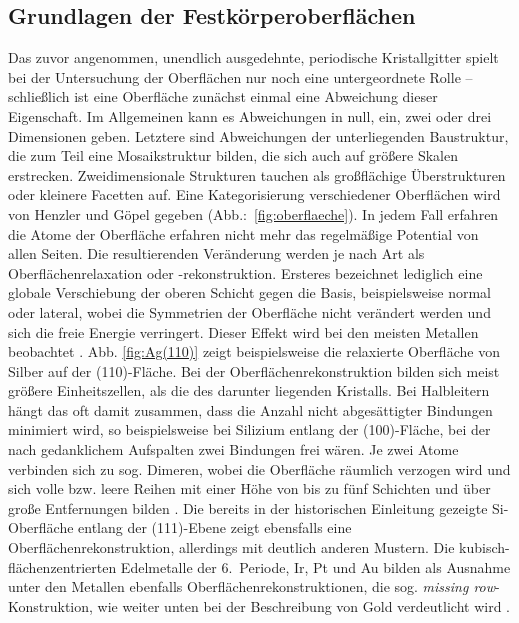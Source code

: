 \subsection{Grundlagen der Festkörperoberflächen}
Das zuvor angenommen, unendlich ausgedehnte, periodische Kristallgitter spielt 
bei der Untersuchung der Oberflächen nur noch eine untergeordnete Rolle – 
schließlich ist eine Oberfläche zunächst einmal eine Abweichung dieser 
Eigenschaft. Im Allgemeinen kann es Abweichungen in null, ein, zwei oder drei 
Dimensionen geben. Letztere sind Abweichungen der unterliegenden Baustruktur, 
die zum Teil eine Mosaikstruktur bilden, die sich auch auf größere Skalen 
erstrecken. Zweidimensionale Strukturen tauchen als großflächige 
Überstrukturen oder kleinere Facetten auf. Eine Kategorisierung verschiedener 
Oberflächen wird von Henzler und Göpel \cite{henzler1991oberflachenphysik} 
gegeben (Abb.:~\ref{fig:oberflaeche}).
In jedem Fall erfahren die Atome der Oberfläche erfahren nicht mehr das 
regelmäßige Potential von allen Seiten. Die resultierenden Veränderung werden je 
nach Art als Oberflächenrelaxation oder -rekonstruktion. 
Ersteres bezeichnet lediglich eine globale Verschiebung der oberen Schicht 
gegen die Basis, beispielsweise normal oder lateral, wobei die Symmetrien 
der Oberfläche nicht verändert werden und sich die freie Energie verringert. 
Dieser Effekt wird bei den meisten Metallen beobachtet \cite{oura2003surface}. 
Abb. \ref{fig:Ag(110)} zeigt beispielsweise die relaxierte Oberfläche von Silber 
auf der (110)-Fläche.
Bei der Oberflächenrekonstruktion bilden sich meist größere Einheitszellen, als die 
des darunter liegenden Kristalls. Bei Halbleitern hängt das oft damit zusammen, 
dass die Anzahl nicht abgesättigter Bindungen minimiert wird, so beispielsweise 
bei Silizium entlang der (100)-Fläche, bei der nach gedanklichem Aufspalten zwei 
Bindungen frei wären. Je zwei Atome verbinden sich zu sog. Dimeren, wobei die 
Oberfläche räumlich verzogen wird und sich volle bzw. leere Reihen mit einer 
Höhe von bis zu fünf Schichten und über große Entfernungen bilden 
\cite{chadi1979atomic}. Die bereits in der historischen Einleitung gezeigte 
Si-Oberfläche entlang der 
(111)-Ebene zeigt ebensfalls eine Oberflächenrekonstruktion, allerdings mit 
deutlich anderen Mustern. Die kubisch-flächenzentrierten Edelmetalle der 
6.~Periode, Ir, Pt und Au bilden als Ausnahme unter den Metallen ebenfalls 
Oberflächenrekonstruktionen, die sog. \emph{missing row}-Konstruktion, 
wie weiter unten bei der Beschreibung von Gold verdeutlicht wird 
\cite{kittel2013einfuhrung}. 

